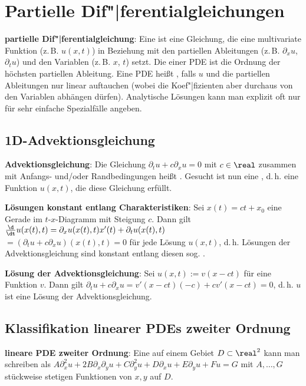 \chapter{%
    Partielle Dif"|ferentialgleichungen%
}

\textbf{partielle Dif"|ferentialgleichung}:
Eine  ist eine Gleichung,
die eine multivariate Funktion (z.\,B. $u(x, t)$) in Beziehung mit den partiellen Ableitungen
(z.\,B. $\partial_x u$, $\partial_t u$) und den Variablen (z.\,B. $x$, $t$) setzt.
Die  einer PDE ist die Ordnung der höchsten partiellen Ableitung.
Eine PDE heißt , falls $u$ und die partiellen Ableitungen nur linear auftauchen
(wobei die Koef"|fizienten aber durchaus von den Variablen abhängen dürfen).
Analytische Lösungen kann man explizit oft nur für sehr einfache Spezialfälle angeben.

\section{%
    1D-Advektionsgleichung%
}

\textbf{Advektionsgleichung}:
Die Gleichung $\partial_t u + c \partial_x u = 0$ mit $c \in \real$ zusammen mit
Anfangs- und/oder Randbedingungen heißt .
Gesucht ist nun eine , d.\,h. eine Funktion $u(x, t)$,
die diese Gleichung erfüllt.

\textbf{Lösungen konstant entlang Charakteristiken}:
Sei $x(t) = ct + x_0$ eine Gerade im $t$-$x$-Diagramm mit Steigung $c$.
Dann gilt $\frac{\d}{\dt} u(x(t), t) = \partial_x u(x(t), t) x'(t) + \partial_t u(x(t), t)$\\
$= (\partial_t u + c \partial_x u)(x(t), t) = 0$ für jede Lösung $u(x, t)$,
d.\,h. Lösungen der Advektionsgleichung sind konstant entlang diesen sog.
.

\textbf{Lösung der Advektionsgleichung}:
Sei $u(x, t) := v(x - ct)$ für eine Funktion $v$.
Dann gilt $\partial_t u + c \partial_x u = v'(x - ct) (-c) + c v'(x - ct) = 0$,
d.\,h. $u$ ist eine Lösung der Advektionsgleichung.

\section{%
    Klassifikation linearer PDEs zweiter Ordnung%
}

\textbf{lineare PDE zweiter Ordnung}:
Eine  auf einem Gebiet $D \subset \real^2$ kann man schreiben
als $A \partial_x^2 u + 2B \partial_x \partial_y u + C \partial_y^2 u +
D \partial_x u + E \partial_y u + Fu = G$ mit $A, \dotsc, G$ stückweise stetigen Funktionen
von $x, y$ auf $D$.

